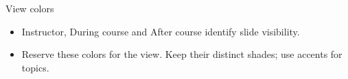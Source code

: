 \begin{standardframe}{View colors}

\begin{itemize}
\item Instructor, During course and After course identify slide visibility.
\item Reserve these colors for the view. Keep their distinct shades; use accents for topics.
\end{itemize}
\end{standardframe}
